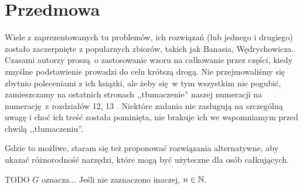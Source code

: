 

\tableofcontents

\chapter*{Przedmowa}
Wiele z zaprezentowanych tu problemów, ich rozwiązań (lub jednego i drugiego) zostało zaczerpnięte z popularnych zbiorów, takich jak \cite{wedrychowicz12} Banasia, Wędrychowicza.
Czasami autorzy proszą o zastosowanie wzoru na całkowanie przez części, kiedy zmyślne podstawienie prowadzi do celu krótszą drogą.
Nie przejmowaliśmy się zbytnio poleceniami z ich książki, ale żeby się w tym wszystkim nie pogubić, zamieszczamy na ostatnich stronach ,,tłumaczenie'' naszej numeracji na numerację z rozdziałów 12, 13 \cite{wedrychowicz12}.
Niektóre zadania nie zasługują na szczególną uwagę i choć ich treść została pominięta, nie brakuje ich we wspomniamym przed chwilą ,,tłumaczeniu''.

Gdzie to możliwe, staram się też proponować rozwiązania alternatywne, aby ukazać różnorodność narzędzi, które mogą być użyteczne dla osób całkujących.

TODO
$G$ oznacza...
Jeśli nie zaznaczono inaczej, $n \in {\mathbb N}$.


